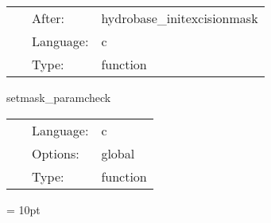 \hspace{5mm}{\it set hydro\_excision\_mask according to spherical surface information } 


\hspace{5mm}

 \begin{tabular*}{160mm}{cll} 
~ & After:  & hydrobase\_initexcisionmask \\ 
~ & Language:  & c \\ 
~ & Type:  & function \\ 
\end{tabular*} 


\vspace{5mm}


\hspace{5mm} setmask\_paramcheck 

\hspace{5mm}{\it check parameters for consistency } 


\hspace{5mm}

 \begin{tabular*}{160mm}{cll} 
~ & Language:  & c \\ 
~ & Options:  & global \\ 
~ & Type:  & function \\ 
\end{tabular*} 



\vspace{5mm}\parskip = 10pt 
